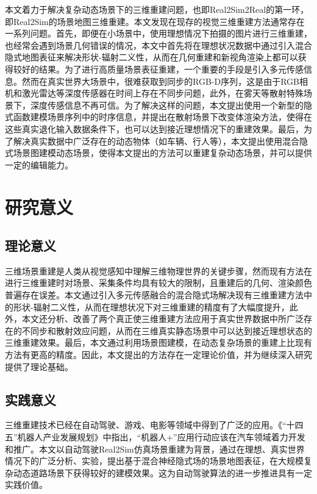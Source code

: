 本文着力于解决复杂动态场景下的三维重建问题，也即Real2Sim2Real的第一环，即Real2Sim的场景地图三维重建。本文发现在现存的视觉三维重建方法通常存在一系列问题。首先，即便在小场景中，使用理想情况下拍摄的图片进行三维重建，也经常会遇到场景几何错误的情况，本文中首先将在理想状况数据中通过引入混合隐式地图表征来解决形状-辐射二义性，从而在几何重建和新视角渲染上都可以获得较好的结果。为了进行高质量场景表征重建，一个重要的手段是引入多元传感信息。然而在真实世界大场景中，很难获取到同步的RGB-D序列，这是由于RGB相机和激光雷达等深度传感器在时间上存在不同步问题，此外，在雾天等散射特殊场景下，深度传感信息不再可信。为了解决这样的问题，本文提出使用一个新型的隐式函数建模场景序列中的时序信息，并提出在散射场景下改变体渲染方法，使得在这些真实退化输入数据条件下，也可以达到接近理想情况下的重建效果。最后，为了解决真实数据中广泛存在的动态物体（如车辆、行人等），本文提出使用混合隐式场景图建模动态场景，使得本文提出的方法可以重建复杂动态场景，并可以提供一定的编辑能力。


\section{研究意义}
\subsection{理论意义}
三维场景重建是人类从视觉感知中理解三维物理世界的关键步骤，然而现有方法在进行三维重建时对场景、采集条件均具有较大的限制，且重建后的几何、渲染颜色普遍存在误差。本文通过引入多元传感融合的混合隐式场解决现有三维重建方法中的形状-辐射二义性，从而在理想状况下对三维重建的精度有了大幅度提升，此外，本文还分析、改善了两个真正使三维重建方法应用于真实世界数据中所广泛存在的不同步和散射效应问题，从而在三维真实静态场景中可以达到接近理想状态的三维重建效果。最后，本文通过利用场景图建模，在动态复杂场景的重建上比现有方法有更高的精度。因此，本文提出的方法存在一定理论价值，并为继续深入研究提供了理论基础。

\subsection{实践意义}
三维重建技术已经在自动驾驶、游戏、电影等领域中得到了广泛的应用。《“十四五”机器人产业发展规划》中指出，“机器人+”应用行动应该在汽车领域着力开发和推广。本文以自动驾驶Real2Sim仿真场景重建为背景，通过在理想、真实世界情况下的广泛分析、实验，提出基于混合神经隐式场的场景地图表征，在大规模复杂动态道路场景下获得较好的建模效果。这为自动驾驶算法的进一步推进具有一定实践价值。

